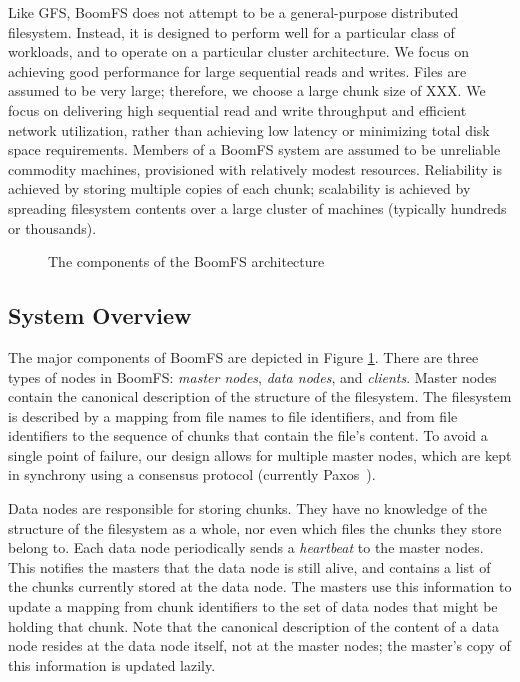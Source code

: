 \documentclass{article}
\begin{document}
Like GFS, BoomFS does not attempt to be a general-purpose distributed
filesystem. Instead, it is designed to perform well for a particular
class of workloads, and to operate on a particular cluster
architecture. We focus on achieving good performance for large
sequential reads and writes. Files are assumed to be very large;
therefore, we choose a large chunk size of XXX. We focus on delivering
high sequential read and write throughput and efficient network
utilization, rather than achieving low latency or minimizing total
disk space requirements. Members of a BoomFS system are assumed to be
unreliable commodity machines, provisioned with relatively modest
resources.  Reliability is achieved by storing multiple copies of each
chunk; scalability is achieved by spreading filesystem contents over
a large cluster of machines (typically hundreds or thousands).

\begin{figure}
\centering
{}
\caption{The components of the BoomFS architecture}
\label{fig:system-arch}
\end{figure}

\subsection{System Overview}
The major components of BoomFS are depicted in Figure
\ref{fig:system-arch}. There are three types of nodes in BoomFS:
\emph{master nodes}, \emph{data nodes}, and \emph{clients}. Master
nodes contain the canonical description of the structure of the
filesystem. The filesystem is described by a mapping from file names
to file identifiers, and from file identifiers to the sequence of
chunks that contain the file's content. To avoid a single point of
failure, our design allows for multiple master nodes, which are kept
in synchrony using a consensus protocol (currently
Paxos~\cite{paxos-made-simple}).

Data nodes are responsible for storing chunks. They have no knowledge
of the structure of the filesystem as a whole, nor even which files
the chunks they store belong to. Each data node periodically sends a
\emph{heartbeat} to the master nodes. This notifies the masters that
the data node is still alive, and contains a list of the chunks
currently stored at the data node. The masters use this information to
update a mapping from chunk identifiers to the set of data nodes that
might be holding that chunk. Note that the canonical description of
the content of a data node resides at the data node itself, not at the
master nodes; the master's copy of this information is updated lazily.
\end{document}
